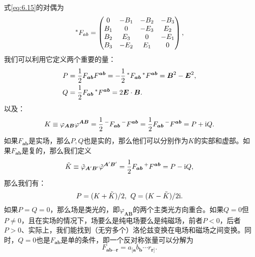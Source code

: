 式\ref{eq:6.15}的对偶为
\begin{equation*}
	\prescript{*}{}{} F_{ab} =\begin{pmatrix}
		0 & -B_{1} & -B_{2} & -B_{3}\\
		B_{1} & 0 & -E_{3} & E_{2}\\
		B_{2} & E_{3} & 0 & -E_{1}\\
		B_{3} & -E_{2} & E_{1} & 0
	\end{pmatrix} ,
\end{equation*}
我们可以利用它定义两个重要的量：
\begin{equation*}
	\begin{aligned}
		P & =\frac{1}{2} F_{\boldsymbol{ab}} F^{\boldsymbol{ab}} =-\frac{1}{2}\prescript{*}{}{} F_{\boldsymbol{ab}}\prescript{*}{}{} F^{\boldsymbol{ab}} =\boldsymbol{B}^{2} -\boldsymbol{E}^{2} ,\\
		Q & =\frac{1}{2} F_{\boldsymbol{ab}}\prescript{*}{}{} F^{\boldsymbol{ab}} =2\boldsymbol{E} \cdot \boldsymbol{B} .
	\end{aligned}
\end{equation*}
以及：
\begin{equation*}
	K\equiv \varphi _{\boldsymbol{AB}} \varphi ^{\boldsymbol{AB}} =\frac{1}{2}\prescript{-}{}{} F_{\boldsymbol{ab}}\prescript{-}{}{} F^{\boldsymbol{ab}} =\frac{1}{2} F_{\boldsymbol{ab}}\prescript{-}{}{} F^{\boldsymbol{ab}} =P+\mathrm{i} Q.
\end{equation*}
如果$F_{\boldsymbol{ab}}$是实场，那么$P,Q$也是实的，那么他们可以分别作为$K$的实部和虚部。如果$F_{\boldsymbol{ab}}$是复的，那么我们定义
\begin{equation*}
	\tilde{K} \equiv \tilde{\varphi }_{\boldsymbol{A} '\boldsymbol{B} '}\tilde{\varphi }^{\boldsymbol{A} '\boldsymbol{B} '} =\frac{1}{2} F_{\boldsymbol{ab}}\prescript{+}{}{} F^{\boldsymbol{ab}} =P-\mathrm{i} Q,
\end{equation*}
那么我们有：
\begin{equation*}
	P=( K+\tilde{K}) /2,\kern+0.4em Q=( K-\tilde{K}) /2\mathrm{i} .
\end{equation*}
如果$P=Q=0$，那么场是类光的，即$\varphi _{\boldsymbol{AB}}$的两个主类光方向重合。如果$Q=0$但$P\neq 0$，且在实场的情况下，场要么是纯电场要么是纯磁场，前者$P< 0$，后者$P >0$、实际上，我们能找到（无穷多个）洛伦兹变换在电场和磁场之间变换。同时，$Q=0$也是$F_{\boldsymbol{ab}}$是单的条件，即一个反对称张量可以分解为
\begin{equation*}
	F_{\boldsymbol{ab} \cdots \boldsymbol{r}} =a_{[\boldsymbol{a}} b_{\boldsymbol{b}} \cdots r_{\boldsymbol{r}]} .
\end{equation*}


